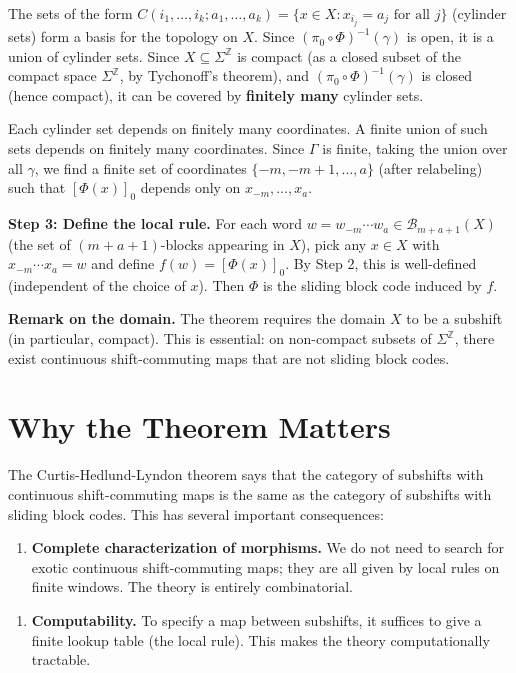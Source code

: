 The sets of the form $C(i_1, \ldots, i_k; a_1, \ldots, a_k) = \{ x \in X : x_{i_j} = a_j \text{ for all } j\} $ (cylinder sets) form a basis for the topology on $X$. Since $(\pi_0 \circ \Phi)^{-1}(\gamma)$ is open, it is a union of cylinder sets. Since $X \subseteq \Sigma^\mathbb{Z}$ is compact (as a closed subset of the compact space $\Sigma^\mathbb{Z}$, by Tychonoff's theorem), and $(\pi_0 \circ \Phi)^{-1}(\gamma)$ is closed (hence compact), it can be covered by \textbf{finitely many} cylinder sets.

Each cylinder set depends on finitely many coordinates. A finite union of such sets depends on finitely many coordinates. Since $\Gamma$ is finite, taking the union over all $\gamma$, we find a finite set of coordinates $\{ -m, -m+1, \ldots, a\} $ (after relabeling) such that $[\Phi(x)]_0$ depends only on $x_{-m}, \ldots, x_a$.

\textbf{Step 3: Define the local rule.} For each word $w = w_{-m} \cdots w_a \in \mathcal{B}_{m+a+1}(X)$ (the set of $(m+a+1)$-blocks appearing in $X$), pick any $x \in X$ with $x_{-m} \cdots x_a = w$ and define $f(w) = [\Phi(x)]_0$. By Step 2, this is well-defined (independent of the choice of $x$). Then $\Phi$ is the sliding block code induced by $f$. 

\textbf{Remark on the domain.} The theorem requires the domain $X$ to be a subshift (in particular, compact). This is essential: on non-compact subsets of $\Sigma^\mathbb{Z}$, there exist continuous shift-commuting maps that are not sliding block codes.



\section{Why the Theorem Matters}

The Curtis-Hedlund-Lyndon theorem says that the category of subshifts with continuous shift-commuting maps is the same as the category of subshifts with sliding block codes. This has several important consequences:

\begin{enumerate}
\item \textbf{Complete characterization of morphisms.} We do not need to search for exotic continuous shift-commuting maps; they are all given by local rules on finite windows. The theory is entirely combinatorial.
\end{enumerate}

\begin{enumerate}
\item \textbf{Computability.} To specify a map between subshifts, it suffices to give a finite lookup table (the local rule). This makes the theory computationally tractable.
\end{enumerate}

